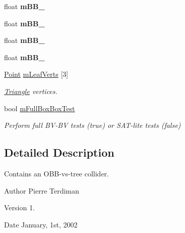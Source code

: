 \begin{DoxyCompactItemize}
\item 
\hypertarget{class_o_b_b_collider_ad60595833b8626f182a69536737c0a34}{float {\bfseries m\+B\+B\+\_}}\label{class_o_b_b_collider_ad60595833b8626f182a69536737c0a34}

\item 
\hypertarget{class_o_b_b_collider_a5be6b9a63136d2a57162b0f61dd1abf2}{float {\bfseries m\+B\+B\+\_}}\label{class_o_b_b_collider_a5be6b9a63136d2a57162b0f61dd1abf2}

\item 
\hypertarget{class_o_b_b_collider_a7cbb8b569756091d6a10c5774f561d86}{float {\bfseries m\+B\+B\+\_}}\label{class_o_b_b_collider_a7cbb8b569756091d6a10c5774f561d86}

\item 
\hypertarget{class_o_b_b_collider_ad12058c42c9e2dc31f4cd8416b3bc963}{float {\bfseries m\+B\+B\+\_}}\label{class_o_b_b_collider_ad12058c42c9e2dc31f4cd8416b3bc963}

\item 
\hypertarget{class_o_b_b_collider_a23dc8fecb5ba4c64bea47b218e0a9570}{\hyperlink{class_point}{Point} \hyperlink{class_o_b_b_collider_a23dc8fecb5ba4c64bea47b218e0a9570}{m\+Leaf\+Verts} \mbox{[}3\mbox{]}}\label{class_o_b_b_collider_a23dc8fecb5ba4c64bea47b218e0a9570}

\begin{DoxyCompactList}\small\item\em \hyperlink{class_triangle}{Triangle} vertices. \end{DoxyCompactList}\item 
\hypertarget{class_o_b_b_collider_a7b07a8f74b083bc75d3fa798cd4ec9cd}{bool \hyperlink{class_o_b_b_collider_a7b07a8f74b083bc75d3fa798cd4ec9cd}{m\+Full\+Box\+Box\+Test}}\label{class_o_b_b_collider_a7b07a8f74b083bc75d3fa798cd4ec9cd}

\begin{DoxyCompactList}\small\item\em Perform full B\+V-\/\+B\+V tests (true) or S\+A\+T-\/lite tests (false) \end{DoxyCompactList}\end{DoxyCompactItemize}


\subsection{Detailed Description}
Contains an O\+B\+B-\/vs-\/tree collider.

\begin{DoxyAuthor}{Author}
Pierre Terdiman 
\end{DoxyAuthor}
\begin{DoxyVersion}{Version}
1. 
\end{DoxyVersion}
\begin{DoxyDate}{Date}
January, 1st, 2002 
\end{DoxyDate}


